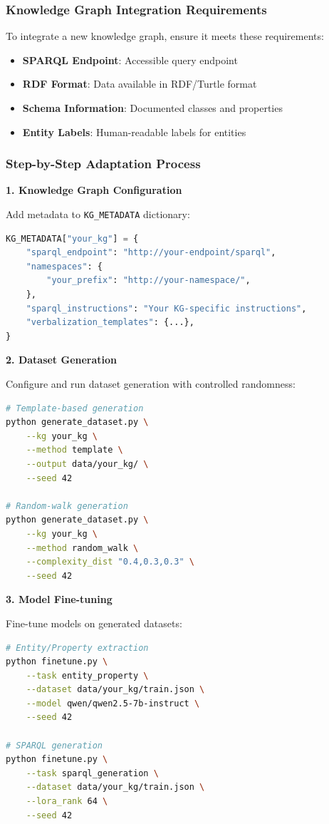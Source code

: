 \subsubsection{Knowledge Graph Integration Requirements}
To integrate a new knowledge graph, ensure it meets these requirements:

\begin{itemize}
    \item \textbf{SPARQL Endpoint}: Accessible query endpoint
    \item \textbf{RDF Format}: Data available in RDF/Turtle format
    \item \textbf{Schema Information}: Documented classes and properties
    \item \textbf{Entity Labels}: Human-readable labels for entities
\end{itemize}

\subsubsection{Step-by-Step Adaptation Process}

\textbf{1. Knowledge Graph Configuration}

Add metadata to \texttt{KG\_METADATA} dictionary:
\begin{lstlisting}[language=Python]
KG_METADATA["your_kg"] = {
    "sparql_endpoint": "http://your-endpoint/sparql",
    "namespaces": {
        "your_prefix": "http://your-namespace/",
    },
    "sparql_instructions": "Your KG-specific instructions",
    "verbalization_templates": {...},
}
\end{lstlisting}

\textbf{2. Dataset Generation}

Configure and run dataset generation with controlled randomness:
\begin{lstlisting}[language=bash]
# Template-based generation
python generate_dataset.py \
    --kg your_kg \
    --method template \
    --output data/your_kg/ \
    --seed 42

# Random-walk generation  
python generate_dataset.py \
    --kg your_kg \
    --method random_walk \
    --complexity_dist "0.4,0.3,0.3" \
    --seed 42
\end{lstlisting}

\textbf{3. Model Fine-tuning}

Fine-tune models on generated datasets:
\begin{lstlisting}[language=bash]
# Entity/Property extraction
python finetune.py \
    --task entity_property \
    --dataset data/your_kg/train.json \
    --model qwen/qwen2.5-7b-instruct \
    --seed 42

# SPARQL generation
python finetune.py \
    --task sparql_generation \
    --dataset data/your_kg/train.json \
    --lora_rank 64 \
    --seed 42
\end{lstlisting}

